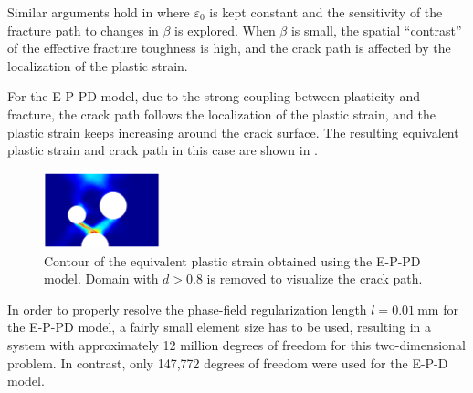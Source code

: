 Similar arguments hold in  where $\varepsilon_0$ is kept constant and the sensitivity of the fracture path to changes in $\beta$ is explored. When $\beta$ is small, the spatial ``contrast'' of the effective fracture toughness is high, and the crack path is affected by the localization of the plastic strain.



For the E-P-PD model, due to the strong coupling between plasticity and fracture, the crack path follows the localization of the plastic strain, and the plastic strain keeps increasing around the crack surface.  The resulting equivalent plastic strain and crack path in this case are shown in .

\begin{figure}[htb!]
  \centering
  \includegraphics[width=0.3\textwidth,scale=0.5]{Chapter5/figures/3pb/2D_EPPD}
  \caption{Contour of the equivalent plastic strain obtained using the E-P-PD model. Domain with $d > 0.8$ is removed to visualize the crack path.}
  \label{fig: tpb-2d-eppd}
\end{figure}

\begin{remark}
  \vspace{-0.5em}
  In order to properly resolve the phase-field regularization length $l = \SI{0.01}{\milli\meter}$ for the E-P-PD model, a fairly small element size has to be used, resulting in a system with approximately 12 million degrees of freedom for this two-dimensional problem. In contrast, only 147,772 degrees of freedom were used for the E-P-D model.
\end{remark}

